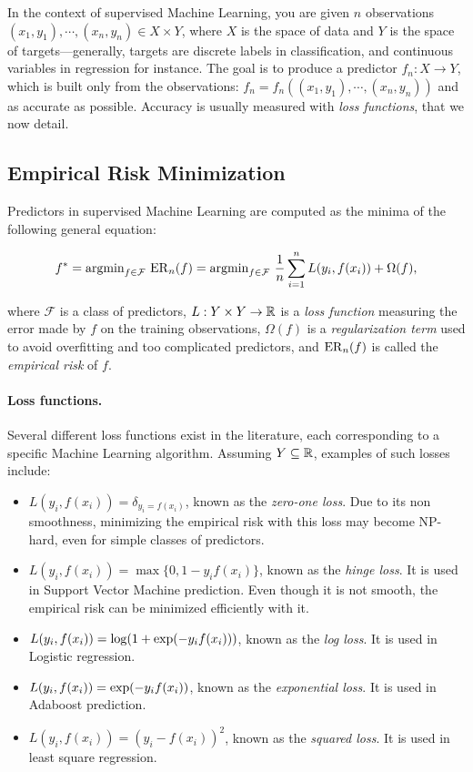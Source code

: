 In the context of supervised Machine Learning, you are given $n$ observations 
$(x_1,y_1),\cdots,(x_n,y_n)\in X\times Y$, where $X$ is the space of data and $Y$ is the space of targets---generally, 
targets are discrete labels in classification, and continuous variables in regression for instance.
The goal is to produce a predictor $f_n:X\rightarrow Y$, which is built only from the observations: $f_n=f_n((x_1,y_1),\cdots,(x_n,y_n))$
and as accurate as possible. Accuracy is usually measured with {\em loss functions}, that we now detail.

  

\subsection{Empirical Risk Minimization}

Predictors in supervised Machine Learning are computed as the minima of the following general equation:

\begin{equation}\label{eq:ERM}
f^* = {\rm argmin}_{f\in\mathcal{F}}\ {\rm ER}_n(f) = {\rm argmin}_{f\in\mathcal{F}}\ \frac 1n \sum_{i=1}^n L(y_i,f(x_i)) + \Omega(f), 
\end{equation}

where $\mathcal F$ is a class of predictors, 
$L:Y\times Y\rightarrow \mathbb{R}$ is a {\em loss function} measuring the error made by $f$ on the training observations,
$\Omega(f)$ is a {\em regularization term} used to avoid overfitting and too complicated predictors,
and ${\rm ER}_n(f)$ is called the {\em empirical risk} of $f$.

\paragraph*{Loss functions.} Several different loss functions exist in the literature, each corresponding to 
a specific Machine Learning algorithm. Assuming $Y\subseteq\mathbb{R}$, examples of such losses include:

\begin{itemize}
\item $L(y_i,f(x_i))=\delta_{y_i=f(x_i)}$, known as the {\em zero-one loss}. Due to its non smoothness,
minimizing the empirical risk with this loss may become NP-hard, even for simple classes of predictors.
\item $L(y_i,f(x_i))=\max\{0, 1-y_if(x_i)\}$, known as the {\em hinge loss}. It is used in Support Vector Machine prediction.
Even though it is not smooth, %
the empirical risk can be minimized efficiently with it.
\item $L(y_i,f(x_i))={\rm log}(1+{\rm exp}(-y_if(x_i)))$, known as the {\em log loss}. It is used in Logistic regression.
\item $L(y_i,f(x_i))={\rm exp}(-y_if(x_i))$, known as the {\em exponential loss}. It is used in Adaboost prediction.
\item $L(y_i,f(x_i))=(y_i - f(x_i))^2$, known as the {\em squared loss}. It is used in least square regression.
\end{itemize}

